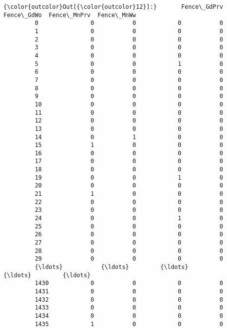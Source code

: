 \documentclass[11pt]{article}
\begin{document}
\begin{Verbatim}[commandchars=\\\{\}]
{\color{outcolor}Out[{\color{outcolor}12}]:}       Fence\_GdPrv  Fence\_GdWo  Fence\_MnPrv  Fence\_MnWw
         0               0           0            0           0
         1               0           0            0           0
         2               0           0            0           0
         3               0           0            0           0
         4               0           0            0           0
         5               0           0            1           0
         6               0           0            0           0
         7               0           0            0           0
         8               0           0            0           0
         9               0           0            0           0
         10              0           0            0           0
         11              0           0            0           0
         12              0           0            0           0
         13              0           0            0           0
         14              0           1            0           0
         15              1           0            0           0
         16              0           0            0           0
         17              0           0            0           0
         18              0           0            0           0
         19              0           0            1           0
         20              0           0            0           0
         21              1           0            0           0
         22              0           0            0           0
         23              0           0            0           0
         24              0           0            1           0
         25              0           0            0           0
         26              0           0            0           0
         27              0           0            0           0
         28              0           0            0           0
         29              0           0            0           0
         {\ldots}           {\ldots}         {\ldots}          {\ldots}         {\ldots}
         1430            0           0            0           0
         1431            0           0            0           0
         1432            0           0            0           0
         1433            0           0            0           0
         1434            0           0            0           0
         1435            1           0            0           0

\end{Verbatim}
\end{document}
